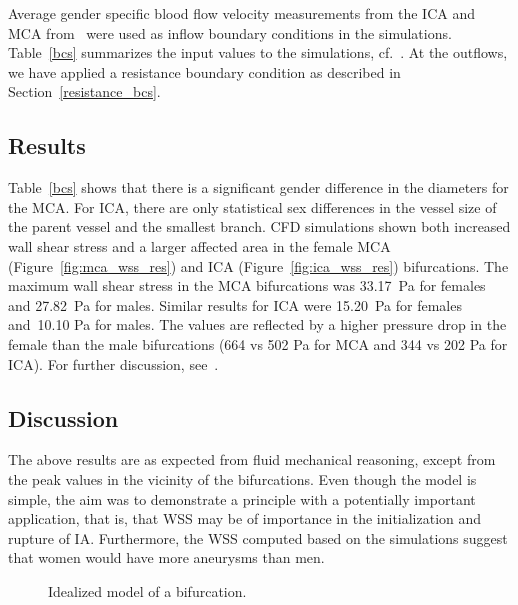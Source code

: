 Average gender specific blood flow velocity measurements from the ICA
and MCA from~\cite{krejza} were used as inflow boundary conditions in
the simulations. Table~\ref{bcs} summarizes the input values to the
simulations, cf.~\cite{kvs-sex}.  At the outflows, we have applied a
resistance boundary condition as described in
Section~\ref{resistance_bcs}.

\subsection{Results}

Table~\ref{bcs} shows that there is a significant gender difference in
the diameters for the MCA. For ICA,  there are only
statistical sex differences in the vessel size of the parent vessel
and the smallest branch. CFD simulations shown both increased wall
shear stress and a larger affected area in the female MCA
(Figure~\ref{fig:mca_wss_res}) and ICA (Figure~\ref{fig:ica_wss_res})
bifurcations. The maximum wall shear stress in the MCA bifurcations
was 33.17~Pa for females and 27.82~Pa for males. Similar results for
ICA were 15.20~Pa for females and~10.10 Pa for males. The values are
reflected by a higher pressure drop in the female than the male
bifurcations (664 vs 502 Pa for MCA and 344 vs 202 Pa for ICA). For
further discussion, see~\cite{kvs-sex}.

\subsection{Discussion}

The above results are as expected from fluid mechanical reasoning,
except from the peak values in the vicinity of the bifurcations. Even
though the model is simple, the aim was to demonstrate a principle
with a potentially important application, that is, that WSS may be of
importance in the initialization and rupture of IA.  Furthermore, the
WSS computed based on the simulations suggest that women would have
more aneurysms than men.

\begin{figure}
  \begin{center}
  \end{center}
  \caption{Idealized model of a bifurcation.}
\end{figure}

